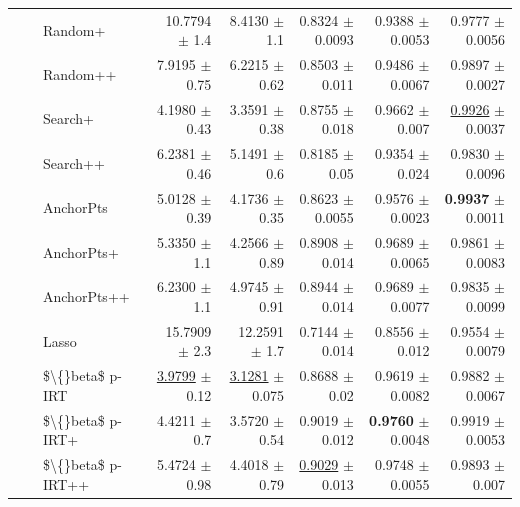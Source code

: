 \begin{longtable}{llp{}rrrrr}
 &  & Random+ & 10.7794 {\scriptsize $\pm$ 1.4} & 8.4130 {\scriptsize $\pm$ 1.1} & 0.8324 {\scriptsize $\pm$ 0.0093} & 0.9388 {\scriptsize $\pm$ 0.0053} & 0.9777 {\scriptsize $\pm$ 0.0056} \\
 &  & Random++ & 7.9195 {\scriptsize $\pm$ 0.75} & 6.2215 {\scriptsize $\pm$ 0.62} & 0.8503 {\scriptsize $\pm$ 0.011} & 0.9486 {\scriptsize $\pm$ 0.0067} & 0.9897 {\scriptsize $\pm$ 0.0027} \\
 &  & Search+ & 4.1980 {\scriptsize $\pm$ 0.43} & 3.3591 {\scriptsize $\pm$ 0.38} & 0.8755 {\scriptsize $\pm$ 0.018} & 0.9662 {\scriptsize $\pm$ 0.007} & \underline{0.9926} {\scriptsize $\pm$ 0.0037} \\
 &  & Search++ & 6.2381 {\scriptsize $\pm$ 0.46} & 5.1491 {\scriptsize $\pm$ 0.6} & 0.8185 {\scriptsize $\pm$ 0.05} & 0.9354 {\scriptsize $\pm$ 0.024} & 0.9830 {\scriptsize $\pm$ 0.0096} \\
 &  & AnchorPts & 5.0128 {\scriptsize $\pm$ 0.39} & 4.1736 {\scriptsize $\pm$ 0.35} & 0.8623 {\scriptsize $\pm$ 0.0055} & 0.9576 {\scriptsize $\pm$ 0.0023} & \textbf{0.9937} {\scriptsize $\pm$ 0.0011} \\
 &  & AnchorPts+ & 5.3350 {\scriptsize $\pm$ 1.1} & 4.2566 {\scriptsize $\pm$ 0.89} & 0.8908 {\scriptsize $\pm$ 0.014} & 0.9689 {\scriptsize $\pm$ 0.0065} & 0.9861 {\scriptsize $\pm$ 0.0083} \\
 &  & AnchorPts++ & 6.2300 {\scriptsize $\pm$ 1.1} & 4.9745 {\scriptsize $\pm$ 0.91} & 0.8944 {\scriptsize $\pm$ 0.014} & 0.9689 {\scriptsize $\pm$ 0.0077} & 0.9835 {\scriptsize $\pm$ 0.0099} \\
 &  & Lasso & 15.7909 {\scriptsize $\pm$ 2.3} & 12.2591 {\scriptsize $\pm$ 1.7} & 0.7144 {\scriptsize $\pm$ 0.014} & 0.8556 {\scriptsize $\pm$ 0.012} & 0.9554 {\scriptsize $\pm$ 0.0079} \\
 &  & \$\textbackslash\{\}beta\$ p-IRT & \underline{3.9799} {\scriptsize $\pm$ 0.12} & \underline{3.1281} {\scriptsize $\pm$ 0.075} & 0.8688 {\scriptsize $\pm$ 0.02} & 0.9619 {\scriptsize $\pm$ 0.0082} & 0.9882 {\scriptsize $\pm$ 0.0067} \\
 &  & \$\textbackslash\{\}beta\$ p-IRT+ & 4.4211 {\scriptsize $\pm$ 0.7} & 3.5720 {\scriptsize $\pm$ 0.54} & 0.9019 {\scriptsize $\pm$ 0.012} & \textbf{0.9760} {\scriptsize $\pm$ 0.0048} & 0.9919 {\scriptsize $\pm$ 0.0053} \\
 &  & \$\textbackslash\{\}beta\$ p-IRT++ & 5.4724 {\scriptsize $\pm$ 0.98} & 4.4018 {\scriptsize $\pm$ 0.79} & \underline{0.9029} {\scriptsize $\pm$ 0.013} & 0.9748 {\scriptsize $\pm$ 0.0055} & 0.9893 {\scriptsize $\pm$ 0.007} \\

\end{longtable}
